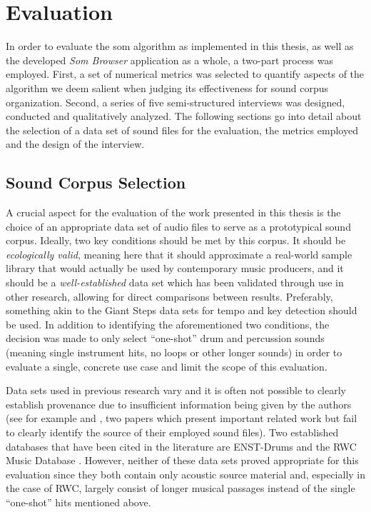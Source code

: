 
\section{Evaluation}
\label{sec:evaluation}
In order to evaluate the \gls{som} algorithm as implemented in this thesis, as
well as the developed \textit{Som Browser} application as a whole, a two-part
process was employed. First, a set of numerical metrics was selected to quantify
aspects of the algorithm we deem salient when judging its effectiveness for
sound corpus organization. Second, a series of five semi-structured interviews
was designed, conducted and qualitatively analyzed. The following sections go
into detail about the selection of a data set of sound files for the evaluation,
the metrics employed and the design of the interview.

\subsection{Sound Corpus Selection}
\label{subsec:eval_corpus_selection}
A crucial aspect for the evaluation of the work presented in this thesis is the
choice of an appropriate data set of audio files to serve as a prototypical
sound corpus. Ideally, two key conditions should be met by this corpus. It
should be \textit{ecologically valid}, meaning here that it should approximate a
real-world sample library that would actually be used by contemporary music
producers, and it should be a \textit{well-established} data set which has been
validated through use in other research, allowing for direct comparisons between
results. Preferably, something akin to the Giant Steps data sets
\citep{knees2015} for tempo and key detection should be used.
In addition to identifying the aforementioned two conditions, the decision was
made to only select ``one-shot'' drum and percussion sounds (meaning single
instrument hits, no loops or other longer sounds) in order to evaluate a single,
concrete use case and limit the scope of this evaluation.

\smallskip

Data sets used in previous research vary and it is often not possible to clearly
establish provenance due to insufficient information being given by the authors
(see for example \citet{fried2014} and \citet{shier2017}, two papers which
present important related work but fail to clearly identify the source of their
employed sound files). Two established databases that have been cited in the
literature are ENST-Drums \citep{gillet2006} and the RWC Music Database
\citep{goto2002}. However, neither of these data sets proved appropriate for
this evaluation since they both contain only acoustic source material and,
especially in the case of RWC, largely consist of longer musical passages
instead of the single ``one-shot'' hits mentioned above.

